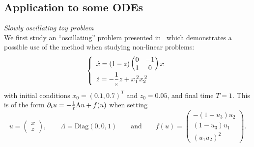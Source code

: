 \subsection{Application to some ODEs}
\label{tests_subsec:oscill}
\hspace*{1pt}

\noindent\textit{Slowly oscillating toy problem}\\
%
We first study an ``oscillating'' problem presented in~\cite{castella.2016.formal} 
which demonstrates a possible use of the method when studying non-linear problems:
\begin{equation} \label{test-pb:xz_oscil}
\left\{
\begin{array}{ll} \displaystyle
\dot{x} = (1-z) \begin{pmatrix} 0 & -1 \\ 1 & 0 \end{pmatrix} x \\ \displaystyle
\dot z = -\frac{1}{\varepsilon} z + x_1^{\:2}x_2^{\:2} 
\end{array} \right.
\end{equation}
with initial conditions $x_0 = (0.1, 0.7)^T$ and $z_0 = 0.05$, and final time $T = 1$. 
This is of the form $\partial_t u = -\frac{1}{\varepsilon} \Lambda u + f(u)$ when setting 
$$ 
u = \begin{pmatrix} x \\ z \end{pmatrix}, 
\qquad 
\Lambda = 
\text{Diag}(0,0,1)
\qquad\text{and}\qquad
f(u) = \begin{pmatrix}
-(1 - u_3) u_2 \\
(1 - u_3) u_1 \\
(u_1 u_2)^2
\end{pmatrix} .
$$

%

